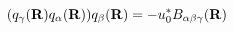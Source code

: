 \begin{equation}                      
(q_{\gamma}({\bf R}) q_{\alpha}({\bf R})) q_{\beta}({\bf R}) = - u_{0}^{*}                       
B_{\alpha \beta \gamma}({\bf R})                      
\end{equation} 
